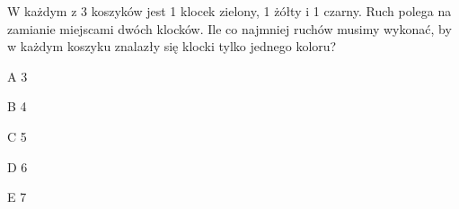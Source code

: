 \begin{tresc}
W każdym z 3 koszyków jest 1 klocek zielony, 1 żółty i 1 czarny. Ruch polega na zamianie miejscami dwóch klocków. Ile co najmniej ruchów musimy wykonać, by w każdym koszyku znalazły się klocki tylko jednego koloru?
\end{tresc}
\begin{wariant}{A} 3 \end{wariant}
\begin{wariant}{B} 4 \end{wariant}
\begin{wariant}{C} 5 \end{wariant}
\begin{wariant}{D} 6 \end{wariant}
\begin{wariant}{E} 7 \end{wariant}
